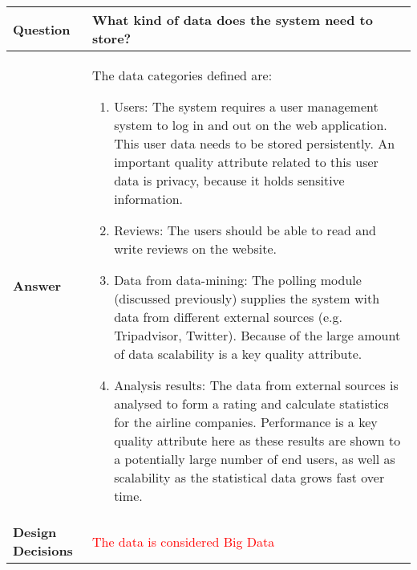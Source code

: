 \begin{longtable}{| l |  p{12cm} |}
\hline
\textbf{Question} & \textbf{What kind of data does the system need to store?} \\ \hline
\textbf{Answer} &
The data categories defined are:
\begin{enumerate}
\item Users: The system requires a user management system to log in and out on the web application. This user data needs to be stored persistently. An important quality attribute related to this user data is privacy, because it holds sensitive information.
\item Reviews: The users should be able to read and write reviews on the website.
\item Data from data-mining: The polling module (discussed previously) supplies the system with data from different external sources (e.g. Tripadvisor, Twitter). Because of the large amount of data scalability is a key quality attribute.
\item Analysis results: The data from external sources is analysed to form a rating and calculate statistics for the airline companies. Performance is a key quality attribute here as these results are shown to a potentially large number of end users, as well as scalability as the statistical data grows fast over time.
\end{enumerate} \\ \hline
\textbf{Design Decisions} & \textcolor{red}{The data is considered Big Data} \\ \hline
\end{longtable}


